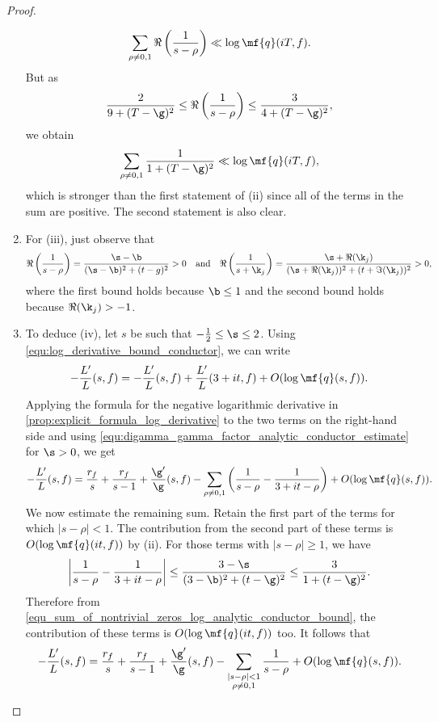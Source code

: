 \begin{proof}
\begin{enumerate}[label=(\roman*)]
        \[
          \sum_{\rho \neq 0,1}\Re\left(\frac{1}{s-\rho}\right) \ll \log{\mf{q}(iT,f)}.
        \]
        But as
        \[
          \frac{2}{9+(T-\g)^{2}} \le \Re\left(\frac{1}{s-\rho}\right) \le \frac{3}{4+(T-\g)^{2}},
        \]
        we obtain
        \begin{equation}\label{equ_sum_of_nontrivial_zeros_log_analytic_conductor_bound}
          \sum_{\rho \neq 0,1}\frac{1}{1+(T-\g)^{2}} \ll \log{\mf{q}(iT,f)},
        \end{equation}
        which is stronger than the first statement of (ii) since all of the terms in the sum are positive. The second statement is also clear.
        \item For (iii), just observe that
        \[
          \Re\left(\frac{1}{s-\rho}\right) = \frac{\s-\b}{(\s-\b)^{2}+(t-
          g)^{2}} > 0 \quad \text{and} \quad \Re\left(\frac{1}{s+\k_{j}}\right) = \frac{\s+\Re(\k_{j})}{(\s+\Re(\k_{j}))^{2}+(t+\Im(\k_{j}))^{2}} > 0,
        \]
        where the first bound holds because $\b \le 1$ and the second bound holds because $\Re(\k_{j}) > -1$.
        \item To deduce (iv), let $s$ be such that $-\frac{1}{2} \le \s \le 2$. Using \cref{equ:log_derivative_bound_conductor}, we can write
        \[
          -\frac{L'}{L}(s,f) = -\frac{L'}{L}(s,f)+\frac{L'}{L}(3+it,f)+O(\log{\mf{q}(s,f)}).
        \]
        Applying the formula for the negative logarithmic derivative in \cref{prop:explicit_formula_log_derivative} to the two terms on the right-hand side and using \cref{equ:digamma_gamma_factor_analytic_conductor_estimate} for $\s > 0$, we get
        \[
          -\frac{L'}{L}(s,f) = \frac{r_{f}}{s}+\frac{r_{f}}{s-1}+\frac{\g'}{\g}(s,f)-\sum_{\rho \neq 0,1}\left(\frac{1}{s-\rho}-\frac{1}{3+it-\rho}\right)+O(\log{\mf{q}(s,f)}).
        \]
        We now estimate the remaining sum. Retain the first part of the terms for which $|s-\rho| < 1$. The contribution from the second part of these terms is $O(\log{\mf{q}(it,f)})$ by (ii). For those terms with $|s-\rho| \ge 1$, we have
        \[
          \left|\frac{1}{s-\rho}-\frac{1}{3+it-\rho}\right| \le \frac{3-\s}{(3-\b)^{2}+(t-\g)^{2}} \le \frac{3}{1+(t-\g)^{2}}.
        \]
        Therefore from \cref{equ_sum_of_nontrivial_zeros_log_analytic_conductor_bound}, the contribution of these terms is $O(\log{\mf{q}(it,f)})$ too. It follows that
        \[
          -\frac{L'}{L}(s,f) = \frac{r_{f}}{s}+\frac{r_{f}}{s-1}+\frac{\g'}{\g}(s,f)-\sum_{\substack{|s-\rho| < 1 \\ \rho \neq 0,1}}\frac{1}{s-\rho}+O(\log{\mf{q}(s,f)}).
\]
\end{enumerate}
\end{proof}

